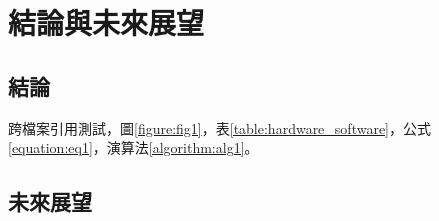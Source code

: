 
\section{結論與未來展望}

\subsection{結論}

跨檔案引用測試，圖\ref{figure:fig1}，表\ref{table:hardware_software}，公式\ref{equation:eq1}，演算法\ref{algorithm:alg1}。

\subsection{未來展望}
